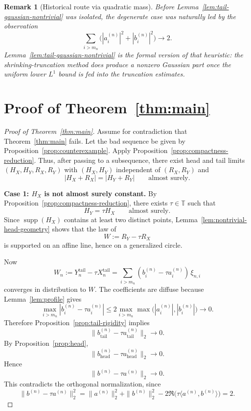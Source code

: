 \documentclass[11pt]{amsart}
\newtheorem{remark}[theorem]{Remark}
\newcommand{\T}{\mathbb{T}}
\newcommand{\supp}{\operatorname{supp}}
\begin{document}
\begin{remark}[Historical route via quadratic mass]
Before Lemma~\ref{lem:tail-gaussian-nontrivial} was isolated, the degenerate
case was naturally led by the observation
\[
  \sum_{i>m_n}\bigl(|a_i^{(n)}|^2+|b_i^{(n)}|^2\bigr)\longrightarrow 2.
\]
Lemma~\ref{lem:tail-gaussian-nontrivial} is the formal version of that
heuristic: the shrinking-truncation method does produce a nonzero Gaussian part
once the uniform lower $L^1$ bound is fed into the truncation estimates.
\end{remark}

\section{Proof of Theorem~\ref{thm:main}}

\begin{proof}[Proof of Theorem~\ref{thm:main}]
Assume for contradiction that Theorem~\ref{thm:main} fails.  Let the bad
sequence be given by Proposition~\ref{prop:counterexample}.  Apply
Proposition~\ref{prop:compactness-reduction}.  Thus, after passing to a
subsequence, there exist head and tail limits $(H_X,H_Y,R_X,R_Y)$ with
$(H_X,H_Y)$ independent of $(R_X,R_Y)$ and
\[
  |H_X+R_X|=|H_Y+R_Y|
  \qquad\text{almost surely.}
\]

\medskip
\noindent
\textbf{Case 1: $H_X$ is not almost surely constant.}
By Proposition~\ref{prop:compactness-reduction}, there exists $\tau\in\T$ such
that
\[
  H_Y=\tau H_X
  \qquad\text{almost surely.}
\]
Since $\supp(H_X)$ contains at least two distinct points,
Lemma~\ref{lem:nontrivial-head-geometry} shows that the law of
\[
  W:=R_Y-\tau R_X
\]
is supported on an affine line, hence on a generalized circle.

Now
\[
  W_n:=Y_n^{\mathrm{tail}}-\tau X_n^{\mathrm{tail}}
  =
  \sum_{i>m_n}(b_i^{(n)}-\tau a_i^{(n)})\,\xi_{n,i}
\]
converges in distribution to $W$.  The coefficients are diffuse because
Lemma~\ref{lem:profile} gives
\[
  \max_{i>m_n}|b_i^{(n)}-\tau a_i^{(n)}|
  \le
  2\max_{i>m_n}\max\bigl(|a_i^{(n)}|,|b_i^{(n)}|\bigr)\longrightarrow 0.
\]
Therefore Proposition~\ref{prop:tail-rigidity} implies
\[
  \|b^{(n)}_{\mathrm{tail}}-\tau a^{(n)}_{\mathrm{tail}}\|_2\longrightarrow 0.
\]
By Proposition~\ref{prop:head},
\[
  \|b^{(n)}_{\mathrm{head}}-\tau a^{(n)}_{\mathrm{head}}\|_2\longrightarrow 0.
\]
Hence
\[
  \|b^{(n)}-\tau a^{(n)}\|_2\longrightarrow 0.
\]
This contradicts the orthogonal normalization, since
\[
  \|b^{(n)}-\tau a^{(n)}\|_2^2
  =
  \|a^{(n)}\|_2^2+\|b^{(n)}\|_2^2
  -2\Re\bigl(\tau\langle a^{(n)},b^{(n)}\rangle\bigr)
  = 2.
\]


\end{proof}
\end{document}
